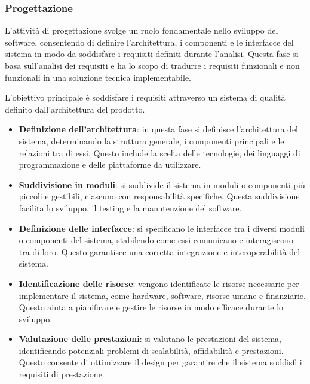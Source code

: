 \subsubsection{Progettazione}
L'attività di progettazione svolge un ruolo fondamentale nello sviluppo del software, consentendo di definire l'architettura, i componenti e le interfacce del sistema in modo da soddisfare i requisiti definiti durante l'analisi.  Questa fase si basa sull'analisi dei requisiti e ha lo scopo di tradurre i requisiti funzionali e non funzionali in una soluzione tecnica implementabile.

L'obiettivo principale è soddisfare i requisiti attraverso un sistema di qualità definito dall'architettura del prodotto.
\begin{itemize}
	\item \textbf{Definizione dell'architettura}: in questa fase si definisce l'architettura del sistema, determinando la struttura generale, i componenti principali e le relazioni tra di essi. Questo include la scelta delle tecnologie, dei linguaggi di programmazione e delle piattaforme da utilizzare.
	\item \textbf{Suddivisione in moduli}: si suddivide il sistema in moduli o componenti più piccoli e gestibili, ciascuno con responsabilità specifiche. Questa suddivisione facilita lo sviluppo, il testing e la manutenzione del software.
	\item \textbf{Definizione delle interfacce}: si specificano le interfacce tra i diversi moduli o componenti del sistema, stabilendo come essi comunicano e interagiscono tra di loro. Questo garantisce una corretta integrazione e interoperabilità del sistema.
	\item \textbf{Identificazione delle risorse}: vengono identificate le risorse necessarie per implementare il sistema, come hardware, software, risorse umane e finanziarie. Questo aiuta a pianificare e gestire le risorse in modo efficace durante lo sviluppo.
	\item \textbf{Valutazione delle prestazioni}: si valutano le prestazioni del sistema, identificando potenziali problemi di scalabilità, affidabilità e prestazioni. Questo consente di ottimizzare il design per garantire che il sistema soddisfi i requisiti di prestazione.
\end{itemize}

